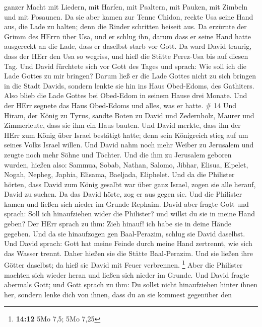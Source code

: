 ganzer Macht mit Liedern, mit Harfen, mit Psaltern, mit Pauken, mit
Zimbeln und mit Posaunen.  Da sie aber kamen zur Tenne
Chidon, reckte Usa seine Hand aus, die Lade zu halten; denn die Rinder
schritten beiseit aus.  Da erzürnte der Grimm des HErrn
über Usa, und er schlug ihn, darum dass er seine Hand hatte ausgereckt
an die Lade, dass er daselbst starb vor Gott.  Da ward
David traurig, dass der HErr den Usa so wegriss, und hieß die Stätte
Perez-Usa bis auf diesen Tag.  Und David fürchtete sich vor
Gott des Tages und sprach: Wie soll ich die Lade Gottes zu mir bringen?
 Darum ließ er die Lade Gottes nicht zu sich bringen in die
Stadt Davids, sondern lenkte sie hin ins Haus Obed-Edoms, des Gathiters.
 Also blieb die Lade Gottes bei Obed-Edom in seinem Hause
drei Monate. Und der HErr segnete das Haus Obed-Edoms und alles, was er
hatte. \# 14  Und Hiram, der König zu Tyrus, sandte Boten zu
David und Zedernholz, Maurer und Zimmerleute, dass sie ihm ein Haus
bauten.  Und David merkte, dass ihn der HErr zum König über
Israel bestätigt hatte; denn sein Königreich stieg auf um seines Volks
Israel willen.  Und David nahm noch mehr Weiber zu Jerusalem
und zeugte noch mehr Söhne und Töchter.  Und die ihm zu
Jerusalem geboren wurden, hießen also: Sammua, Sobab, Nathan, Salomo,
 Jibhar, Elisua, Elpelet,  Nogah, Nepheg,
Japhia,  Elisama, Baeljada, Eliphelet.  Und da
die Philister hörten, dass David zum König gesalbt war über ganz Israel,
zogen sie alle herauf, David zu suchen. Da das David hörte, zog er aus
gegen sie.  Und die Philister kamen und ließen sich nieder
im Grunde Rephaim.  David aber fragte Gott und sprach: Soll
ich hinaufziehen wider die Philister? und willst du sie in meine Hand
geben? Der HErr sprach zu ihm: Zieh hinauf! ich habe sie in deine Hände
gegeben.  Und da sie hinaufzogen gen Baal-Perazim, schlug
sie David daselbst. Und David sprach: Gott hat meine Feinde durch meine
Hand zertrennt, wie sich das Wasser trennt. Daher hießen sie die Stätte
Baal-Perazim.  Und sie ließen ihre Götter daselbst; da hieß
sie David mit Feuer verbrennen. \footnote{\textbf{14:12} 5Mo 7,5; 5Mo
  7,25}  Aber die Philister machten sich wieder heran und
ließen sich nieder im Grunde.  Und David fragte abermals
Gott; und Gott sprach zu ihm: Du sollst nicht hinaufziehen hinter ihnen
her, sondern lenke dich von ihnen, dass du an sie kommest gegenüber den
